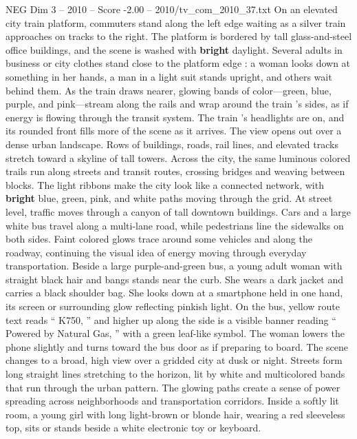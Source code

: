 \begin{textsample}{NEG Dim 3 – 2010 – Score -2.00 – 2010/tv\_com\_2010\_37.txt}  \label{ex:f3_neg_008}
On an elevated city train platform, commuters stand along the left edge waiting as a silver train approaches on tracks to the right.
The platform is bordered by tall glass-and-steel office buildings, and the scene is washed with \textbf{bright} daylight.
Several adults in business or city clothes stand close to the platform edge : a woman looks down at something in her hands, a man in a light suit stands upright, and others wait behind them.
As the train draws nearer, glowing bands of color—green, blue, purple, and pink—stream along the rails and wrap around the train ’s sides, as if energy is flowing through the transit system.
The train ’s headlights are on, and its rounded front fills more of the scene as it arrives.
The view opens out over a dense urban landscape.
Rows of buildings, roads, rail lines, and elevated tracks stretch toward a skyline of tall towers.
Across the city, the same luminous colored trails run along streets and transit routes, crossing bridges and weaving between blocks.
The light ribbons make the city look like a connected network, with \textbf{bright} blue, green, pink, and white paths moving through the grid.
At street level, traffic moves through a canyon of tall downtown buildings.
Cars and a large white bus travel along a multi-lane road, while pedestrians line the sidewalks on both sides.
Faint colored glows trace around some vehicles and along the roadway, continuing the visual idea of energy moving through everyday transportation.
Beside a large purple-and-green bus, a young adult woman with straight black hair and bangs stands near the curb.
She wears a dark jacket and carries a black shoulder bag.
She looks down at a smartphone held in one hand, its screen or surrounding glow reflecting pinkish light.
On the bus, yellow route text reads “ K750, ” and higher up along the side is a visible banner reading “ Powered by Natural Gas, ” with a green leaf-like symbol.
The woman lowers the phone slightly and turns toward the bus door as if preparing to board.
The scene changes to a broad, high view over a gridded city at dusk or night.
Streets form long straight lines stretching to the horizon, lit by white and multicolored bands that run through the urban pattern.
The glowing paths create a sense of power spreading across neighborhoods and transportation corridors.
Inside a softly lit room, a young girl with long light-brown or blonde hair, wearing a red sleeveless top, sits or stands beside a white electronic toy or keyboard.

\end{textsample}
